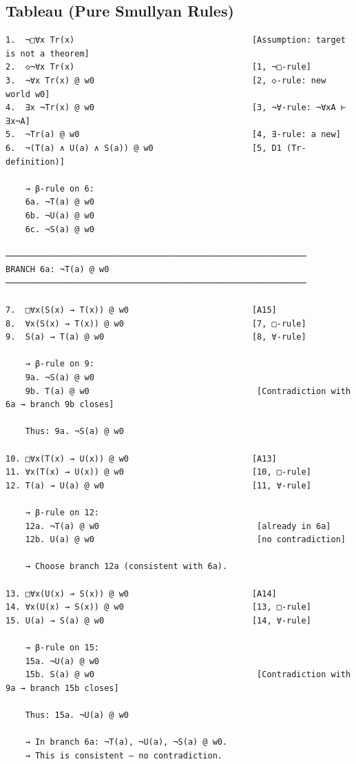 \documentclass[
]{article}
\begin{document}
\subsection{Tableau (Pure Smullyan Rules)}

\begin{verbatim}
1.  ¬□∀x Tr(x)                                    [Assumption: target is not a theorem]
2.  ◇¬∀x Tr(x)                                    [1, ¬□-rule]
3.  ¬∀x Tr(x) @ w0                                [2, ◇-rule: new world w0]
4.  ∃x ¬Tr(x) @ w0                                [3, ¬∀-rule: ¬∀xA ⊢ ∃x¬A]
5.  ¬Tr(a) @ w0                                   [4, ∃-rule: a new]
6.  ¬(T(a) ∧ U(a) ∧ S(a)) @ w0                    [5, D1 (Tr-definition)]

    → β-rule on 6:
    6a. ¬T(a) @ w0
    6b. ¬U(a) @ w0
    6c. ¬S(a) @ w0

─────────────────────────────────────────────────────────────
BRANCH 6a: ¬T(a) @ w0
─────────────────────────────────────────────────────────────

7.  □∀x(S(x) → T(x)) @ w0                         [A15]
8.  ∀x(S(x) → T(x)) @ w0                          [7, □-rule]
9.  S(a) → T(a) @ w0                              [8, ∀-rule]

    → β-rule on 9:
    9a. ¬S(a) @ w0
    9b. T(a) @ w0                                  [Contradiction with 6a → branch 9b closes]

    Thus: 9a. ¬S(a) @ w0

10. □∀x(T(x) → U(x)) @ w0                         [A13]
11. ∀x(T(x) → U(x)) @ w0                          [10, □-rule]
12. T(a) → U(a) @ w0                              [11, ∀-rule]

    → β-rule on 12:
    12a. ¬T(a) @ w0                                [already in 6a]
    12b. U(a) @ w0                                 [no contradiction]

    → Choose branch 12a (consistent with 6a).

13. □∀x(U(x) → S(x)) @ w0                         [A14]
14. ∀x(U(x) → S(x)) @ w0                          [13, □-rule]
15. U(a) → S(a) @ w0                              [14, ∀-rule]

    → β-rule on 15:
    15a. ¬U(a) @ w0
    15b. S(a) @ w0                                 [Contradiction with 9a → branch 15b closes]

    Thus: 15a. ¬U(a) @ w0

    → In branch 6a: ¬T(a), ¬U(a), ¬S(a) @ w0.
    → This is consistent – no contradiction.


\end{verbatim}
\end{document}
